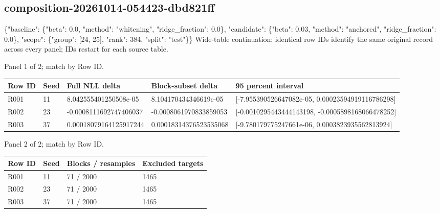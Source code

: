 \documentclass[10pt]{article}
\begin{document}
\subsection{composition-20261014-054423-dbd821ff}
\{"baseline": \{"beta": 0.0, "method": "whitening", "ridge\_fraction": 0.0\}, "candidate": \{"beta": 0.03, "method": "anchored", "ridge\_fraction": 0.0\}, "scope": \{"group": [24, 25], "rank": 384, "split": "test"\}\}
Wide-table continuation: identical row IDs identify the same original record across every panel; IDs restart for each source table.
\par\noindent Panel 1 of 2; match by Row ID.
{\scriptsize\setlength{\tabcolsep}{2pt}
\begin{longtable}{p{}p{}p{}p{}p{}}
Row ID & Seed & Full NLL delta & Block-subset delta & 95 percent interval \\
\hline\endhead
R001 & 11 & 8.042555401250508e-05 & 8.104170434346619e-05 & [-7.955390526647082e-05, 0.00023594919116786298] \\
R002 & 23 & -0.0008111692747406037 & -0.0008061970833859053 & [-0.0010295443444143198, -0.0005898168066478252] \\
R003 & 37 & 0.00018079164125917244 & 0.00018314376523535068 & [-9.780179775247661e-06, 0.0003823935562813924] \\
\end{longtable}}
\par\noindent Panel 2 of 2; match by Row ID.
{\scriptsize\setlength{\tabcolsep}{2pt}
\begin{longtable}{p{}p{}p{}p{}}
Row ID & Seed & Blocks / resamples & Excluded targets \\
\hline\endhead
R001 & 11 & 71 / 2000 & 1465 \\
R002 & 23 & 71 / 2000 & 1465 \\
R003 & 37 & 71 / 2000 & 1465 \\
\end{longtable}}
\end{document}

